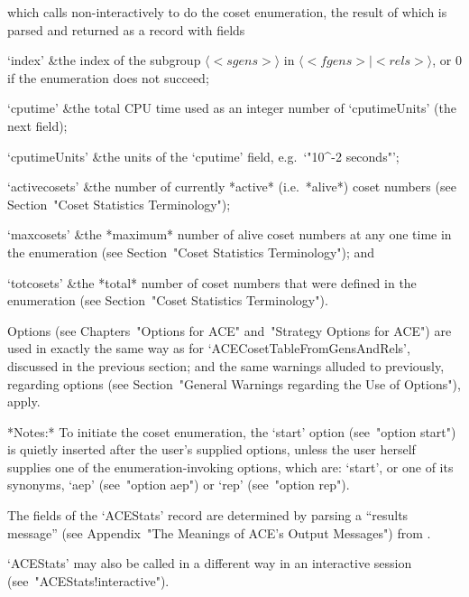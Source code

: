 which calls {\ACE} non-interactively to do the coset enumeration,  the
result of which is parsed and returned as a {\GAP} record with fields

\beginitems

\quad`index' &the index of the subgroup $\langle <sgens>  \rangle$  in
$\langle <fgens> \mid <rels> \rangle$, or $0$ if the enumeration  does
not succeed;

\quad`cputime' &the total CPU  time  used  as  an  integer  number  of
`cputimeUnits' (the next field);

\quad`cputimeUnits' &the units of the  `cputime'  field,  e.g.~`"10^-2
seconds"';

\quad`activecosets' &the number of currently  *active*  (i.e.~*alive*)
coset numbers (see Section~"Coset Statistics Terminology");

\quad`maxcosets' &the *maximum* number of alive coset numbers  at  any
one  time  in   the   enumeration   (see   Section~"Coset   Statistics
Terminology"); and

\quad`totcosets' &the  *total*  number  of  coset  numbers  that  were
defined   in   the   enumeration   (see   Section~"Coset    Statistics
Terminology").

\enditems

Options (see Chapters~"Options  for  ACE"  and~"Strategy  Options  for
ACE")   are   used    in    exactly    the    same    way    as    for
`ACECosetTableFromGensAndRels', discussed in the previous section; and
the same  warnings  alluded  to  previously,  regarding  options  (see
Section~"General Warnings regarding the Use of Options"), apply.

*Notes:*
To initiate the coset enumeration,  the  `start'  option  (see~"option
start") is quietly inserted after the user's supplied options,  unless
the user herself supplies one  of  the  enumeration-invoking  options,
which are: `start', or one of its synonyms, `aep'  (see~"option  aep")
or `rep' (see~"option rep").

The fields of the  `ACEStats'  record  are  determined  by  parsing  a
``results  message''  (see  Appendix~"The  Meanings  of  ACE's  Output
Messages") from {\ACE}.

`ACEStats' may also be called in a different  way  in  an  interactive
{\ACE} session (see~"ACEStats!interactive").


